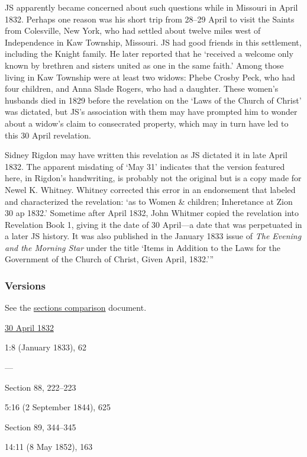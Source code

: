 			JS apparently became concerned about such questions while in Missouri in April 1832. Perhaps one reason was his short trip from 28--29 April to visit the Saints from Colesville, New York, who had settled about twelve miles west of Independence in Kaw Township, Missouri. JS had good friends in this settlement, including the Knight family. He later reported that he `received a welcome only known by brethren and sisters united as one in the same faith.' Among those living in Kaw Township were at least two widows: Phebe Crosby Peck, who had four children, and Anna Slade Rogers, who had a daughter. These women's husbands died in 1829 before the revelation on the `Laws of the Church of Christ' was dictated, but JS's association with them may have prompted him to wonder about a widow's claim to consecrated property, which may in turn have led to this 30 April revelation.

			Sidney Rigdon may have written this revelation as JS dictated it in late April 1832. The apparent misdating of `May 31' indicates that the version featured here, in Rigdon's handwriting, is probably not the original but is a copy made for Newel K. Whitney. Whitney corrected this error in an endorsement that labeled and characterized the revelation: `as to Women \& children; Inheretance at Zion 30 ap 1832.' Sometime after April 1832, John Whitmer copied the revelation into Revelation Book 1, giving it the date of 30 April---a date that was perpetuated in a later JS history. It was also published in the January 1833 issue of \textit{The Evening and the Morning Star} under the title `Items in Addition to the Laws for the Government of the Church of Christ, Given April, 1832.'''
			
	\subsubsection{Versions}
		\label{DC83-V}
		
		See the \href{https://drive.google.com/file/d/1goAvNz8jS4R8slYfMG_db55Ty2z_vmgK/view?usp=sharing}{sections comparison} document.
	
		\begin{compactdesc}
			\item[JSP] \hyperref[EMS-1832-JS-30-APR-1832]{30 April 1832}
			\item[EMS] 1:8 (January 1833), 62
			\item[BC] ---
			\item[DC 1835] Section 88, 222--223
			\item[TS] 5:16 (2 September 1844), 625
			\item[DC 1844] Section 89, 344--345
			\item[MS] 14:11 (8 May 1852), 163
		\end{compactdesc}

